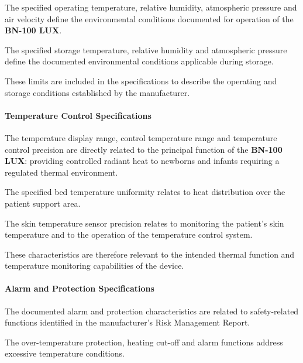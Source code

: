 The specified operating temperature, relative humidity,
atmospheric pressure and air velocity define the environmental
conditions documented for operation of the
\textbf{BN-100 LUX}.

The specified storage temperature, relative humidity and
atmospheric pressure define the documented environmental
conditions applicable during storage.

These limits are included in the specifications to describe the
operating and storage conditions established by the manufacturer.


\paragraph{Temperature Control Specifications}

The temperature display range, control temperature range and
temperature control precision are directly related to the
principal function of the \textbf{BN-100 LUX}: providing controlled
radiant heat to newborns and infants requiring a regulated thermal
environment.

The specified bed temperature uniformity relates to heat
distribution over the patient support area.

The skin temperature sensor precision relates to monitoring the
patient's skin temperature and to the operation of the temperature
control system.

These characteristics are therefore relevant to the intended
thermal function and temperature monitoring capabilities of the
device.


\paragraph{Alarm and Protection Specifications}

The documented alarm and protection characteristics are related
to safety-related functions identified in the manufacturer's
Risk Management Report.

The over-temperature protection, heating cut-off and alarm
functions address excessive temperature conditions.

